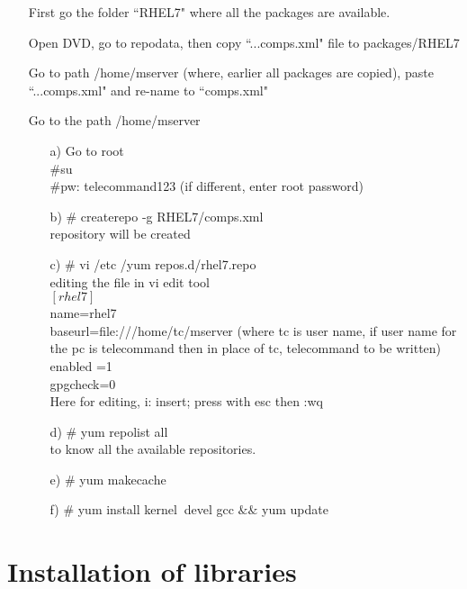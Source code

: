 \begin{enumerate}
	\item [\textbullet] First go the folder ``RHEL7" where all the packages are available. 
	\item [\textbullet] Open DVD, go to repodata, then copy ``...comps.xml" file to packages/RHEL7
	\item [\textbullet] Go to path /home/mserver (where, earlier all packages are copied), paste ``...comps.xml" and re-name to ``comps.xml" 
	\item [\textbullet] Go to the path /home/mserver
			\begin{enumerate}
				\item [a)] Go to root\\
				$\#$su\\
				$\#$pw: telecommand123 (if different, enter root password)
				\item [b)] $\#$ createrepo -g RHEL7/comps.xml\\
				repository will be created
				\item [c)] $\#$ vi /etc /yum repos.d/rhel7.repo \\
				editing the file in vi edit tool\\
				$[rhel7]$\\
				name=rhel7\\
				baseurl=file:///home/tc/mserver (where tc is user name, if user name for the pc is telecommand then in place of tc, telecommand to be written)\\
				enabled =1\\
				gpgcheck=0\\		
				Here for editing, i: insert; press with esc then :wq	
				\item [d)] $\#$ yum repolist all\\
				to know all the available repositories.
				\item [e)] $\#$ yum makecache
				\item [f)] $\#$ yum install kernel $~$devel gcc $\&$$\&$ yum update
			\end{enumerate}
\end{enumerate}

\section{Installation of libraries}

